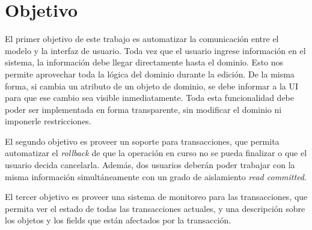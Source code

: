 \section{Objetivo}
\label{Objetivo}
El primer objetivo de este trabajo es automatizar la comunicación entre el
modelo y la interfaz de usuario.
Toda vez que el usuario ingrese información en el sistema, la
información debe llegar directamente hasta el dominio. Esto nos permite
aprovechar toda la lógica del dominio durante la edición.
De la misma forma, si cambia un atributo de un objeto de dominio, se debe
informar a la UI para que ese cambio sea visible
inmediatamente.
Toda esta funcionalidad debe poder ser implementada en forma transparente,
sin modificar el dominio ni imponerle restricciones.

El segundo objetivo es proveer un soporte para transacciones, que
permita automatizar el \emph{rollback} de que la operación en curso no se pueda
finalizar o que el usuario decida cancelarla.
Además, dos usuarios deberán poder trabajar con la misma información
simultáneamente con un grado de aislamiento \emph{read committed}.

El tercer objetivo es proveer una sistema de monitoreo para las transacciones,
que permita ver el estado de todas las transacciones actuales, y una descripción
sobre los objetos y los fields que están afectados por la transacción.
